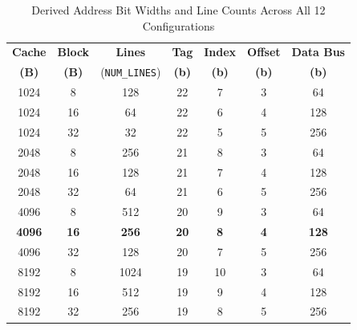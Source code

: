 \documentclass[conference]{IEEEtran}
\begin{document}
\begin{table}[htbp]
\caption{Derived Address Bit Widths and Line Counts Across All 12 Configurations}
\label{tab:param_configs}
\centering
\scriptsize
\setlength{\tabcolsep}{3.5pt}
\begin{tabular}{|c|c|c|c|c|c|c|}
\hline
\textbf{Cache} & \textbf{Block} & \textbf{Lines} & \textbf{Tag} & \textbf{Index} & \textbf{Offset} & \textbf{Data Bus} \\
\textbf{(B)} & \textbf{(B)} & (\texttt{NUM\_LINES}) & \textbf{(b)} & \textbf{(b)} & \textbf{(b)} & \textbf{(b)} \\
\hline
1024 & 8  & 128  & 22 & 7  & 3 & 64  \\
1024 & 16 & 64   & 22 & 6  & 4 & 128 \\
1024 & 32 & 32   & 22 & 5  & 5 & 256 \\
\hline
2048 & 8  & 256  & 21 & 8  & 3 & 64  \\
2048 & 16 & 128  & 21 & 7  & 4 & 128 \\
2048 & 32 & 64   & 21 & 6  & 5 & 256 \\
\hline
4096 & 8  & 512  & 20 & 9  & 3 & 64  \\
\textbf{4096} & \textbf{16} & \textbf{256} & \textbf{20} & \textbf{8} & \textbf{4} & \textbf{128} \\
4096 & 32 & 128  & 20 & 7  & 5 & 256 \\
\hline
8192 & 8  & 1024 & 19 & 10 & 3 & 64  \\
8192 & 16 & 512  & 19 & 9  & 4 & 128 \\
8192 & 32 & 256  & 19 & 8  & 5 & 256 \\
\hline
\end{tabular}
\end{table}
\end{document}
